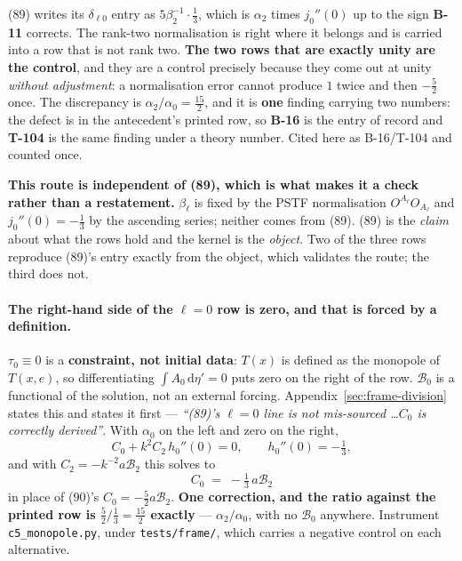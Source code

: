 \noindent
(89) writes its $\delta_{\ell0}$ entry as $5\beta_2^{-1}\cdot\tfrac13$, which
is $\alpha_2$ times $j_0''(0)$ up to the sign \textbf{B-11} corrects. The
rank-two normalisation is right where it belongs and is carried into a row
that is not rank two. \textbf{The two rows that are exactly unity are the
control}, and they are a control precisely because they come out at unity
\emph{without adjustment}: a normalisation error cannot produce $1$ twice and
then $-\tfrac52$ once. The discrepancy is
$\alpha_2/\alpha_0=\tfrac{15}2$, and it is \textbf{one} finding carrying two
numbers: the defect is in the antecedent's printed row, so \textbf{B-16} is
the entry of record and \textbf{T-104} is the same finding under a theory
number. Cited here as B-16/T-104 and counted once.

\textbf{This route is independent of (89), which is what makes it a check
rather than a restatement.} $\beta_\ell$ is fixed by the PSTF normalisation
$O^{A_\ell}O_{A_\ell}$ and $j_0''(0)=-\tfrac13$ by the ascending series;
neither comes from (89). (89) is the \emph{claim} about what the rows hold and
the kernel is the \emph{object}. Two of the three rows reproduce (89)'s entry
exactly from the object, which validates the route; the third does not.

\paragraph{The right-hand side of the $\ell=0$ row is zero, and that is forced
by a definition.} $\tau_0\equiv0$ is a \textbf{constraint, not initial data}:
$T(x)$ is defined as the monopole of $T(x,e)$, so differentiating
$\int A_0\,\mathrm d\eta'=0$ puts zero on the right of the row.
$\mathcal B_0$ is a functional of the solution, not an external forcing.
Appendix~\ref{sec:frame-division} states this and states it first ---
\emph{``(89)'s $\ell=0$ line is not mis-sourced \ldots $C_0$ is correctly
derived''}. With $\alpha_0$ on the left and zero on the right,
\begin{equation}
  C_0 + k^2C_2\,h_0''(0) = 0 ,
  \qquad h_0''(0)=-\tfrac13 ,
\end{equation}
and with $C_2=-k^{-2}a\mathcal B_2$ this solves to
\begin{equation}
  \boxed{\;C_0 \;=\; -\tfrac13\,a\mathcal B_2\;}
  \label{eq:c0-solved}
\end{equation}
in place of (90)'s $C_0=-\tfrac52a\mathcal B_2$. \textbf{One correction, and
the ratio against the printed row is $\tfrac52\big/\tfrac13=\tfrac{15}2$
exactly} --- $\alpha_2/\alpha_0$, with no $\mathcal B_0$ anywhere.
Instrument \texttt{c5\_monopole.py}, under \texttt{tests/frame/}, which carries
a negative control on each alternative.

